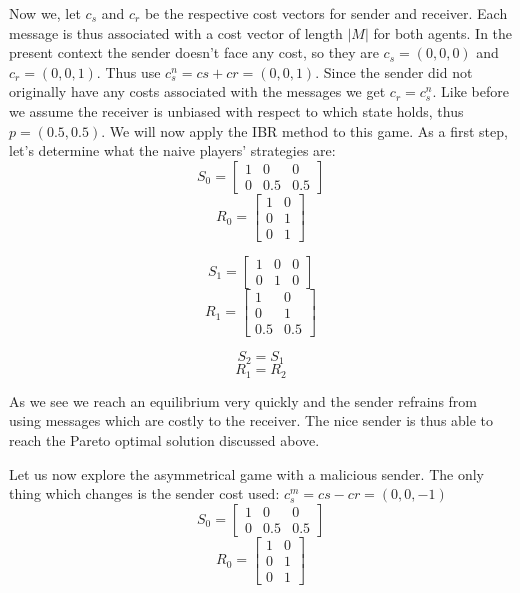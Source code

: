 \documentclass{article}
\begin{document}
Now we, let $c_s$ and $c_r$ be the respective cost vectors for sender and receiver. Each message is thus associated with a cost vector of length $|M|$ for both agents. In the present context the sender doesn't face any cost, so they are $c_s=(0,0,0)$ and $c_r=(0,0,1)$. Thus use $c_s^n=cs + cr=(0,0,1)$. Since the sender did not originally have any costs associated with the messages we get $c_r=c_s^n$. Like before we assume the receiver is unbiased with respect to which state holds, thus $p=(0.5,0.5)$.
We will now apply the IBR method to this game. As a first step, let's determine what the naive players' strategies are:\\
\begin{equation*}
S_0=
\begin{bmatrix}
1 & 0 & 0\\
0 & 0.5 & 0.5
\end{bmatrix}
\end{equation*}
\begin{equation*}
R_0=
\begin{bmatrix}
1 & 0\\
0 & 1\\
0 & 1
\end{bmatrix}
\end{equation*}

\begin{equation*}
S_1=
\begin{bmatrix}
1 & 0 & 0\\
0 & 1 & 0
\end{bmatrix}
\end{equation*}
\begin{equation*}
R_1=
\begin{bmatrix}
1 & 0\\
0 & 1\\
0.5 & 0.5
\end{bmatrix}
\end{equation*}

\begin{equation*}
S_2=S_1
\end{equation*}
\begin{equation*}
R_1=R_2
\end{equation*}

As we see we reach an equilibrium very quickly and the sender refrains from using messages which are costly to the receiver. The nice sender is thus able to reach the Pareto optimal solution discussed above.

Let us now explore the asymmetrical game with a malicious sender. The only thing which changes is the sender cost used: $c_s^m=cs - cr=(0,0,-1)$
\begin{equation*}
S_0=
\begin{bmatrix}
1 & 0 & 0\\
0 & 0.5 & 0.5
\end{bmatrix}
\end{equation*}
\begin{equation*}
R_0=
\begin{bmatrix}
1 & 0\\
0 & 1\\
0 & 1
\end{bmatrix}
\end{equation*}
\end{document}
